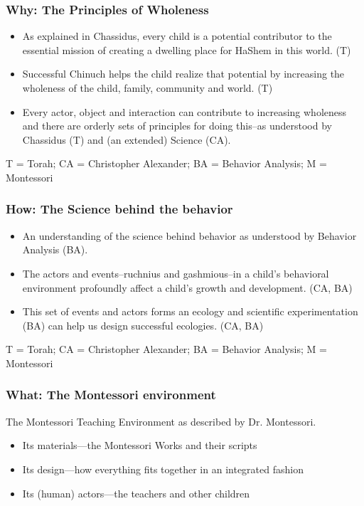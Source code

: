 \documentclass[12pt, handout, notes=show]{beamer}
\newenvironment{itemizeLargerSpacing}
{ \begin{itemize}   
    \setlength{\itemsep}{10pt}
    \setlength{\parskip}{0pt}
    \setlength{\parsep}{0pt}     }
{ \end{itemize}                  }
\begin{document}
\begin{frame}
  \frametitle{Why: The Principles of Wholeness}
  \begin{itemizeLargerSpacing}
  \item As explained in Chassidus, every child is a potential
    contributor to the essential mission of creating a dwelling place
    for HaShem in this world. (T)
  \item Successful Chinuch helps the child realize that potential by
    increasing the wholeness of the child, family, community and
    world. (T)
  \item Every actor, object and interaction can contribute to
    increasing wholeness and there are orderly sets of principles for
    doing this--as understood by Chassidus (T) and (an extended)
    Science (CA).

  \end{itemizeLargerSpacing}

  \scriptsize{T = Torah; CA = Christopher Alexander; BA = Behavior
    Analysis; M = Montessori }
\end{frame}




\begin{frame}
  \frametitle{How: The Science behind the behavior}
  \begin{itemizeLargerSpacing}
  \item An understanding of the science behind behavior as understood
    by Behavior Analysis (BA).
  \item The actors and events--ruchnius and gashmious--in a child’s
    behavioral environment profoundly affect a child’s growth and
    development.  (CA, BA)
  \item This set of events and actors forms an ecology and scientific
    experimentation (BA) can help us design successful ecologies.
    (CA, BA)
  \end{itemizeLargerSpacing}
  \scriptsize{T = Torah; CA = Christopher Alexander; BA = Behavior
    Analysis; M = Montessori }

\end{frame}

\begin{frame}
  \frametitle{What: The Montessori environment}
  The Montessori Teaching Environment as described by Dr. Montessori.
  \begin{itemizeLargerSpacing}
  \item Its materials---the Montessori Works and their scripts
  \item Its design---how everything fits together in an integrated
    fashion
  \item Its (human) actors---the teachers and other children
  \end{itemizeLargerSpacing}
\end{frame}
\end{document}
